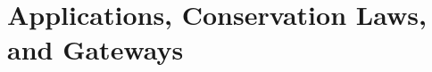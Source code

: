 \documentclass[11pt, openright]{book}
\begin{document}
\part{Applications, Conservation Laws, and Gateways}



\appendix








\backmatter


% 
% 
\end{document}
